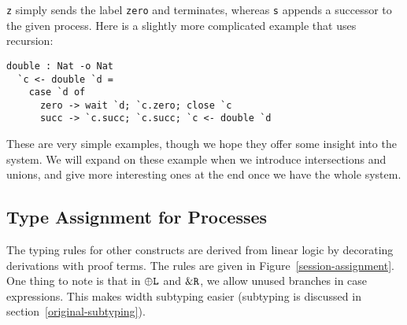 \documentclass[a4paper,USenglish]{lipics-v2016}
\begin{document}
\texttt{z} simply sends the label \texttt{zero} and terminates, whereas \texttt{s} appends a successor to the given process. Here is a slightly more complicated example that uses recursion:

\begin{lstlisting}[language=krill, style=custom]
  double : Nat -o Nat
  `c <- double `d =
    case `d of
      zero -> wait `d; `c.zero; close `c
      succ -> `c.succ; `c.succ; `c <- double `d
\end{lstlisting}

These are very simple examples, though we hope they offer some insight into the system. We will expand on these example when we introduce intersections and unions, and give more interesting ones at the end once we have the whole system. 


\subsection{Type Assignment for Processes}

The typing rules for other constructs are derived from linear logic by decorating derivations with proof terms. The rules are given in Figure~\ref{session-assignment}. One thing to note is that in $\oplus\texttt{L}$ and $\&\texttt{R}$, we allow unused branches in case expressions. This makes width subtyping easier (subtyping is discussed in section~\ref{original-subtyping}).
\end{document}
